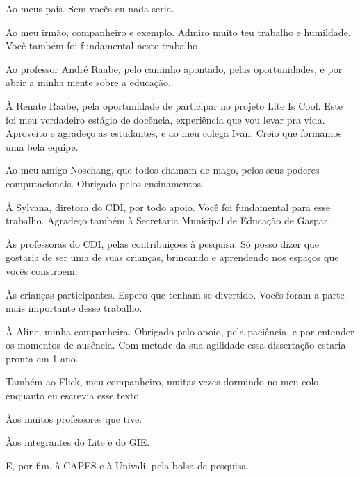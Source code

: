 \begin{agradecimentos}

    Ao meus pais. Sem vocês eu nada seria. 

    Ao meu irmão, companheiro e exemplo. Admiro muito teu trabalho e humildade. Você também foi fundamental neste trabalho. 

    Ao professor André Raabe, pelo caminho apontado, pelas oportunidades, e por abrir a minha mente sobre a educação.

    À Renate Raabe, pela oportunidade de participar no projeto Lite Is Cool. Este foi meu verdadeiro estágio de docência, experiência que vou levar pra vida. Aproveito e agradeço as estudantes, e ao meu colega Ivan. Creio que formamos uma bela equipe.

    Ao meu amigo Noschang, que todos chamam de mago, pelos seus poderes computacionais. Obrigado pelos ensinamentos.

    À Sylvana, diretora do CDI, por todo apoio. Você foi fundamental para esse trabalho. Agradeço também à Secretaria Municipal de Educação de Gaspar. 

    Às professoras do CDI, pelas contribuições à pesquisa. Só posso dizer que gostaria de ser uma de suas crianças, brincando e aprendendo nos espaços que vocês constroem.
    
    Às crianças participantes. Espero que tenham se divertido. Vocês foram a parte mais importante desse trabalho.

    À Aline, minha companheira. Obrigado pelo apoio, pela paciência, e por entender os momentos de ausência. Com metade da sua agilidade essa dissertação estaria pronta em 1 ano.

    Também ao Flick, meu companheiro, muitas vezes dormindo no meu colo enquanto eu escrevia esse texto.

    Àos muitos professores que tive.

    Àos integrantes do Lite e do GIE.

    E, por fim, à CAPES e à Univali, pela bolsa de pesquisa. 

\end{agradecimentos}